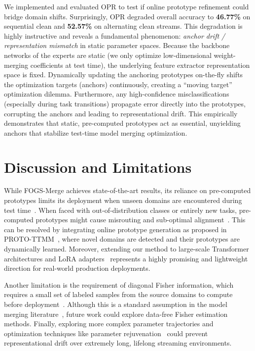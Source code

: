 \documentclass{article}
\theoremstyle{plain}
\theoremstyle{definition}
\theoremstyle{remark}
\begin{document}
We implemented and evaluated OPR to test if online prototype refinement could bridge domain shifts. Surprisingly, OPR degraded overall accuracy to \textbf{46.77\%} on sequential clean and \textbf{52.57\%} on alternating clean streams. This degradation is highly instructive and reveals a fundamental phenomenon: \textit{anchor drift / representation mismatch} in static parameter spaces. Because the backbone networks of the experts are static (we only optimize low-dimensional weight-merging coefficients at test time), the underlying feature extractor representation space is fixed. Dynamically updating the anchoring prototypes on-the-fly shifts the optimization targets (anchors) continuously, creating a ``moving target'' optimization dilemma. Furthermore, any high-confidence misclassifications (especially during task transitions) propagate error directly into the prototypes, corrupting the anchors and leading to representational drift. This empirically demonstrates that static, pre-computed prototypes act as essential, unyielding anchors that stabilize test-time model merging optimization.

\section{Discussion and Limitations}
\label{sec:discussion}
While FOGS-Merge achieves state-of-the-art results, its reliance on pre-computed prototypes limits its deployment when unseen domains are encountered during test time~\cite{protottmm}. When faced with out-of-distribution classes or entirely new tasks, pre-computed prototypes might cause misrouting and sub-optimal alignment~\cite{unbiased_routing}. This can be resolved by integrating online prototype generation as proposed in PROTO-TTMM~\cite{protottmm}, where novel domains are detected and their prototypes are dynamically learned. Moreover, extending our method to large-scale Transformer architectures and LoRA adapters~\cite{dare, llm_merging} represents a highly promising and lightweight direction for real-world production deployments.

Another limitation is the requirement of diagonal Fisher information, which requires a small set of labeled samples from the source domains to compute before deployment~\cite{fisher_merge}. Although this is a standard assumption in the model merging literature~\cite{adamerging}, future work could explore data-free Fisher estimation methods. Finally, exploring more complex parameter trajectories and optimization techniques like parameter rejuvenation~\cite{parameter_rejuvenation} could prevent representational drift over extremely long, lifelong streaming environments.
\end{document}
